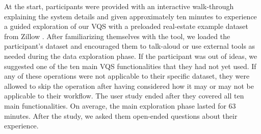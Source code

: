 \par At the start, participants were provided with an interactive walk-through explaining the system details and given approximately ten minutes to experience a guided exploration of our VQS with a preloaded real-estate example dataset from Zillow \cite{zillow}. After familiarizing themselves with the tool, we loaded the participant's dataset and encouraged them to talk-aloud or use external tools as needed during the data exploration phase. If the participant was out of ideas, we suggested one of the ten main VQS functionalities that they had not yet used. If any of these operations were not applicable to their specific dataset, they were allowed to skip the operation after having considered how it may or may not be applicable to their workflow. The user study ended after they covered all ten main functionalities. On average, the main exploration phase lasted for 63 minutes. After the study, we asked them open-ended questions about their experience.%
